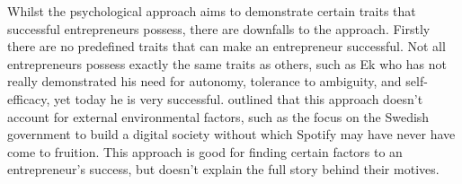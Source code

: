 \par
Whilst the psychological approach aims to demonstrate certain traits that successful entrepreneurs possess, there are downfalls to the approach. Firstly there are no predefined traits that can make an entrepreneur successful. Not all entrepreneurs possess exactly the same traits as others, such as Ek who has not really demonstrated his need for autonomy, tolerance to ambiguity, and self-efficacy, yet today he is very successful. \textcite[][15]{deakins2012} outlined that this approach doesn't account for external environmental factors, such as the focus on the Swedish government to build a digital society \parencite{guardian_save_or_destroy} without which Spotify may have never have come to fruition. This approach is good for finding certain factors to an entrepreneur's success, but doesn't explain the full story behind their motives.

